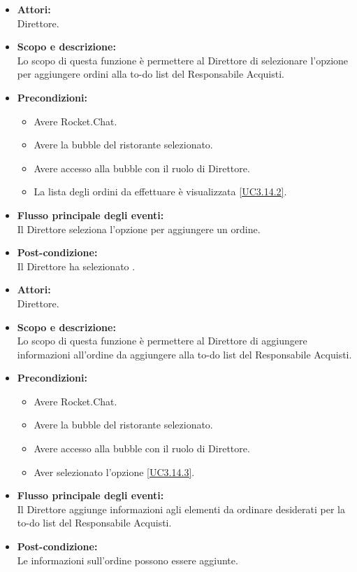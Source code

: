 
\begin{itemize}
	\item \textbf{Attori:}
	\\Direttore.
	\item \textbf{Scopo e descrizione:} 
	\\Lo scopo di questa funzione è permettere al Direttore di selezionare l'opzione per aggiungere ordini alla to-do list del Responsabile Acquisti.
	\item \textbf{Precondizioni:}
	\begin{itemize}
		\item Avere Rocket.Chat.
		\item Avere la bubble del ristorante selezionato.
		\item Avere accesso alla bubble con il ruolo di Direttore.
		\item La lista degli ordini da effettuare è visualizzata \ref{UC3.14.2}.
	\end{itemize}
	\item \textbf{Flusso principale degli eventi:}
	\\Il Direttore seleziona l'opzione per aggiungere un ordine.
	\item \textbf{Post-condizione:}
	\\Il Direttore ha selezionato .
\end{itemize}


\begin{itemize}
	\item \textbf{Attori:}
	\\Direttore.
	\item \textbf{Scopo e descrizione:} 
	\\Lo scopo di questa funzione è permettere al Direttore di aggiungere informazioni all'ordine da aggiungere alla to-do list del Responsabile Acquisti.
	\item \textbf{Precondizioni:}
	\begin{itemize}
		\item Avere Rocket.Chat.
		\item Avere la bubble del ristorante selezionato.
		\item Avere accesso alla bubble con il ruolo di Direttore.
		\item Aver selezionato l'opzione  \ref{UC3.14.3}.
	\end{itemize}
	\item \textbf{Flusso principale degli eventi:}
	\\Il Direttore aggiunge informazioni agli elementi da ordinare desiderati per la to-do list del Responsabile Acquisti.
	\item \textbf{Post-condizione:}
	\\Le informazioni sull'ordine possono essere aggiunte.
\end{itemize}


